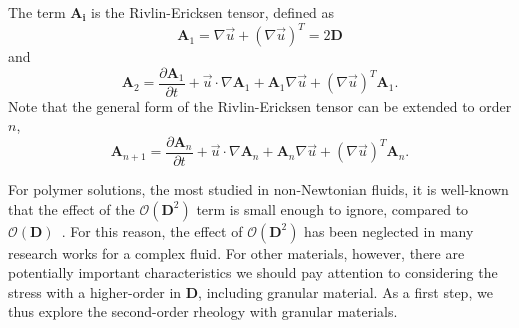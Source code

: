 The term $\bm{A_i}$ is the Rivlin-Ericksen tensor, defined as
\begin{equation}
   {\bm A_1}  = \nabla \vec{u} +  \left( \nabla \vec{u} \right)^T = 2 \bm{D} 
   \label{eq_A1}
\end{equation}
and 
\begin{equation}
   \boldsymbol{A}_2
   =\frac{\partial \boldsymbol{A}_1}{\partial t} + \vec{u} \cdot \nabla \boldsymbol{A}_1+\boldsymbol{A}_1 \nabla \vec{u}+ \left(\nabla \vec{u} \right)^T \boldsymbol{A}_1.
   \label{eq_A2}
\end{equation}
Note that the general form of the Rivlin-Ericksen tensor can be extended to order $n$,  
\begin{equation}
  \boldsymbol{A}_{n+1}
  =\frac{\partial \boldsymbol{A}_{n}}{\partial t} + \vec{u} \cdot \nabla \boldsymbol{A}_n+\boldsymbol{A}_n \nabla \vec{u}+ \left(\nabla \vec{u} \right)^T \boldsymbol{A}_n.
\end{equation}
\par
For polymer solutions, the most studied in non-Newtonian fluids, it is well-known that the effect of the $\mathcal{O}\left( \bm{D}^2 \right)$ term is small enough to ignore, compared to  $\mathcal{O}\left( \bm{D} \right)$~\cite{bird_dynamics_1987}. For this reason, the effect of $\mathcal{O}\left( \bm{D}^2 \right)$ has been neglected in many research works for a complex fluid. 
For other materials, however, there are potentially important characteristics we should pay attention to considering the stress with a higher-order in $\boldsymbol{D}$, including granular material. 
As a first step, we thus explore the second-order rheology with granular materials.



